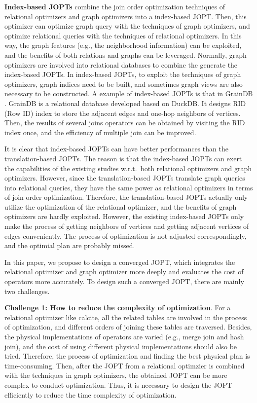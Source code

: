 \documentclass[sigconf, nonacm]{acmart}
\begin{document}
\textbf{Index-based JOPTs} combine the join order optimization techniques of relational optimizers and graph optimizers into a index-based JOPT.
Then, this optimizer can optimize graph query with the techniques of graph optimizers, and optimize relational queries with the techniques of relational optimizers.
In this way, the graph features (e.g., the neighborhood information) can be exploited, and the benefits of both relations and graphs can be leveraged. 
Normally, graph optimizers are involved into relational databases to combine the generate the index-based JOPTs.
In index-based JOPTs, to exploit the techniques of graph optimizers, graph indices need to be built, and sometimes graph views are also necessary to be constructed. 
A example of index-based JOPTs is that in GrainDB \cite{graindb}.
GrainDB is a relational database developed based on DuckDB.
It designs RID (Row ID) index to store the adjacent edges and one-hop neighbors of vertices.
Then, the results of several joins operators can be obtained by visiting the RID index once, and the efficiency of multiple join can be improved.


It is clear that index-based JOPTs can have better performances than the translation-based JOPTs.
The reason is that the index-based JOPTs can exert the capabilities of the existing studies w.r.t.~both relational optimizers and graph optimizers.
However, since the translation-based JOPTs translate graph queries into relational queries, they have the same power as relational optimizers in terms of join order optimization.
Therefore, the translation-based JOPTs actually only utilize the optimization of the relational optimizer, and the benefits of graph optimizers are hardly exploited.
However, the existing index-based JOPTs only make the process of getting neighbors of vertices and getting adjacent vertices of edges conveniently.
The process of optimization is not adjusted correspondingly, and the optimial plan are probably missed.

In this paper, we propose to design a converged JOPT, which integrates the relational optimizer and graph optimizer more deeply and evaluates the cost of operators more accurately. 
To design such a converged JOPT, there are mainly two challenges.

\textbf{Challenge 1: How to reduce the complexity of optimization}. 
For a relational optimizer like calcite, all the related tables are involved in the process of optimization, and different orders of joining these tables are traversed.
Besides, the physical implementations of operators are varied (e.g., merge join and hash join), and the cost of using different physical implementations should also be tried.
Therefore, the process of optimization and finding the best physical plan is time-consuming.
Then, after the JOPT from a relational optimzier is combined with the techniques in graph optimizers, the obtained JOPT can be more complex to conduct optimization.
Thus, it is necessary to design the JOPT efficiently to reduce the time complexity of optimization.
\end{document}
